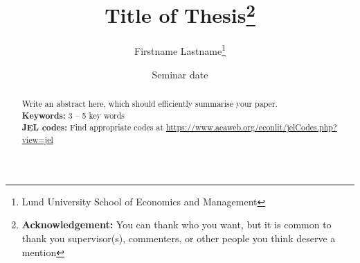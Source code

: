 \documentclass[a4paper, 12pt]{article}
\title{Title of Thesis\footnote{\textbf{Acknowledgement:} You can thank who you want, but it is common to thank you supervisor(s), commenters, or other people you think deserve a mention}}
\author{Firstname Lastname\footnote{Lund University School of Economics and Management}}
\date{Seminar date}
\begin{document}

\newpage
\maketitle
\begin{abstract}
Write an abstract here, which should efficiently summarise your paper. \lipsum[1] \\
    \noindent \textbf{Keywords:}  3 -- 5 key words\\
    \noindent \textbf{JEL codes:} Find appropriate codes at \url{https://www.aeaweb.org/econlit/jelCodes.php?view=jel}  %
\end{abstract}
\setcounter{page}{1}

\hypersetup{linkcolor=blue}








\titleformat{\section}{\normalfont\huge\bfseries}{\thesection}{1em}{} 
\newpage


\newpage

\appendix
\setcounter{page}{1} %



\end{document}
